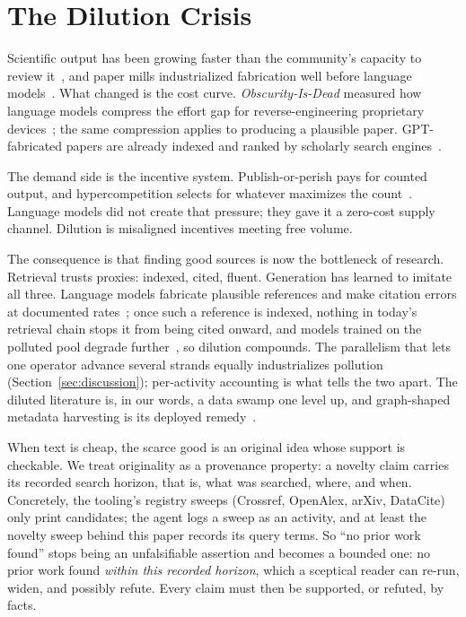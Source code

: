 \section{The Dilution Crisis}\label{sec:dilution}

Scientific output has been growing faster than the community's
capacity to review it~\cite{publishing-strain2024}, and paper mills
industrialized fabrication well before language
models~\cite{paper-mills2021}. What changed is the cost curve.
\emph{Obscurity-Is-Dead} measured how language models compress the
effort gap for reverse-engineering proprietary
devices~\cite{obscurity-is-dead}; the same compression applies to
producing a plausible paper. GPT-fabricated papers are already
indexed and ranked by scholarly search
engines~\cite{gpt-fabricated2024}.

The demand side is the incentive system. Publish-or-perish pays for
counted output, and hypercompetition selects for whatever maximizes
the count~\cite{perverse-incentives2017}. Language models did not
create that pressure; they gave it a zero-cost supply channel.
Dilution is misaligned incentives meeting free volume.

The consequence is that finding good sources is now the bottleneck of
research. Retrieval trusts proxies: indexed, cited, fluent. Generation
has learned to imitate all three. Language models fabricate
plausible references and make citation errors at documented
rates~\cite{fabricated-citations2023, ai-hallucination2023}; once such
a reference is indexed, nothing in today's retrieval chain stops it
from being cited onward, and models trained on the polluted pool
degrade further~\cite{model-collapse2024}, so dilution compounds. The
parallelism that lets one operator advance several strands equally
industrializes pollution (Section~\ref{sec:discussion});
per-activity accounting is what tells the two apart.
The diluted literature is, in our words, a data swamp one level up,
and graph-shaped metadata harvesting is its deployed
remedy~\cite{unhide-helmholtz-kg}.

When text is cheap, the scarce good is an original idea whose support
is checkable. We treat originality as a provenance property: a novelty
claim carries its recorded search horizon, that is, what was searched,
where, and when. Concretely, the tooling's registry sweeps (Crossref,
OpenAlex, arXiv, DataCite) only print candidates; the agent logs a
sweep as an activity, and at least the novelty sweep behind this paper
records its query terms. So ``no prior work found'' stops being an unfalsifiable
assertion and becomes a bounded one: no prior work found \emph{within
this recorded horizon}, which a sceptical reader can re-run, widen,
and possibly refute. Every claim must then be supported, or refuted,
by facts.

